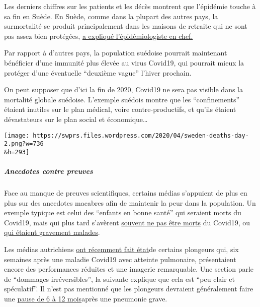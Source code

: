 Les derniers chiffres sur les patients et les décès montrent que
l'épidémie touche à sa fin en Suède. En Suède, comme dans la plupart des
autres pays, la surmortalité se produit principalement dans les maisons
de retraite qui ne sont pas assez bien protégées,
\href{https://www.washingtontimes.com/news/2020/apr/15/sweden-coronavirus-rates-easing-despite-loose-rule/}{a
expliqué l'épidémiologiste en chef.}

Par rapport à d'autres pays, la population suédoise pourrait maintenant
bénéficier d'une immunité plus élevée au virus Covid19, qui pourrait
mieux la protéger d'une éventuelle ``deuxième vague'' l'hiver prochain.

On peut supposer que d'ici la fin de 2020, Covid19 ne sera pas visible
dans la mortalité globale suédoise. L'exemple suédois montre que les
``confinements'' étaient inutiles sur le plan médical, voire
contre-productifs, et qu'ils étaient dévastateurs sur le plan social et
économique\ldots{}

\texttt{[image: https://swprs.files.wordpress.com/2020/04/sweden-deaths-day-2.png?w=736\\\&h=293]}

\hypertarget{anecdotes-contre-preuves}{%
\subparagraph{\texorpdfstring{\textbf{Anecdotes contre
preuves}}{Anecdotes contre preuves}}\label{anecdotes-contre-preuves}}

Face au manque de preuves scientifiques, certains médias s'appuient de
plus en plus sur des anecdotes macabres afin de maintenir la peur dans
la population. Un exemple typique est celui des ``enfants en bonne
santé'' qui seraient morts du Covid19, mais qui plus tard s'avèrent
\href{https://www.dailymail.co.uk/news/article-8193487/Coroner-refuses-rule-COVID-19-cause-death-six-week-old-Connecticut-baby.html}{souvent
ne pas être morts} du Covid19, ou
\href{https://sports.yahoo.com/spanish-football-coach-francisco-garcia-163153573.html}{qui
étaient gravement malades}.

Les médias autrichiens
\href{https://www.rainews.it/tgr/tagesschau/articoli/2020/04/tag-Coronavirus-Lungeschaden-Forschung-Uniklinik-Innsbruck-6708e11e-28dc-4843-a760-e7f926ace61c.html}{ont
récemment fait état}de certains plongeurs qui, six semaines après une
maladie Covid19 avec atteinte pulmonaire, présentaient encore des
performances réduites et une imagerie remarquable. Une section parle de
``dommages irréversibles'', la suivante explique que cela est ``peu
clair et spéculatif''. Il n'est pas mentionné que les plongeurs
devraient généralement faire une
\href{https://www.deeperblue.com/pulmonary-considerations-in-diving/}{pause
de 6 à 12 mois}après une pneumonie grave.

